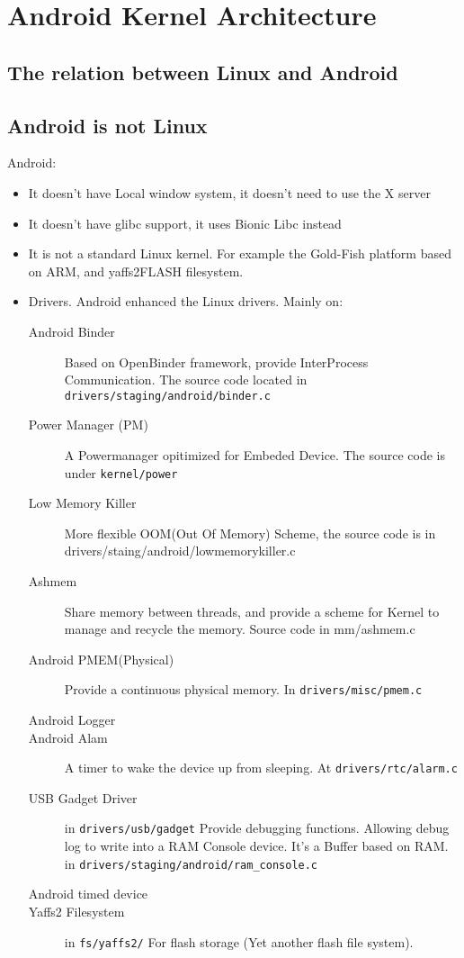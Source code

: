\documentclass[a4paper,11pt]{book}
\begin{document}
\chapter{Android Kernel Architecture}
\section{The relation between Linux and Android}
\section{Android is not Linux}
Android:
\begin{itemize}
\item It doesn't have Local window system, it doesn't need to use the X server
\item It doesn't have glibc support, it uses Bionic Libc instead
\item It is not a standard Linux kernel. For example the Gold-Fish platform
based on ARM, and yaffs2FLASH filesystem.
\item Drivers. Android enhanced the Linux drivers. Mainly on:
  \begin{description}
  \item[Android Binder] Based on OpenBinder framework, provide InterProcess
  Communication. The source code located in
  \verb|drivers/staging/android/binder.c|
  \item[Power Manager (PM)] A Powermanager opitimized for Embeded Device. The
  source code is under \verb|kernel/power|
  \item[Low Memory Killer] More flexible OOM(Out Of Memory) Scheme, the source
  code is in drivers/staing/android/lowmemorykiller.c
  \item[Ashmem] Share memory between threads, and provide a scheme for Kernel to
  manage and recycle the memory. Source code in mm/ashmem.c
  \item[Android PMEM(Physical)] Provide a continuous physical memory. In
  \verb|drivers/misc/pmem.c|
  \item[Android Logger]
  \item[Android Alam] A timer to wake the device up from sleeping. At
  \verb|drivers/rtc/alarm.c|
  \item[USB Gadget Driver] in \verb|drivers/usb/gadget|
   Provide debugging functions. Allowing debug log
  to write into a RAM Console device. It's a Buffer based on RAM. in
  \verb|drivers/staging/android/ram_console.c|
  \item[Android timed device] 
  \item[Yaffs2 Filesystem] in \verb|fs/yaffs2/| For flash storage (Yet another
  flash file system).
  
  \end{description}
\end{itemize}
\end{document}
